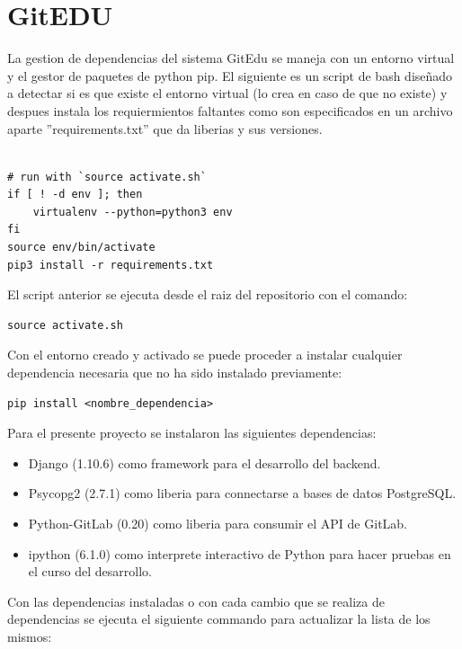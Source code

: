 \pagebreak


\section{GitEDU}

La gestion de dependencias del sistema GitEdu se maneja con un entorno virtual y el gestor de paquetes de python pip. El siguiente es un script de bash diseñado a detectar si es que existe el entorno virtual (lo crea en caso de que no existe) y despues instala los requiermientos faltantes como son especificados en un archivo aparte ''requirements.txt'' que da liberias y sus versiones.

\begin{lstlisting}

# run with `source activate.sh` 
if [ ! -d env ]; then
	virtualenv --python=python3 env
fi
source env/bin/activate
pip3 install -r requirements.txt

\end{lstlisting}

El script anterior se ejecuta desde el raiz del repositorio con el comando:

\begin{lstlisting}
source activate.sh
\end{lstlisting}

Con el entorno creado y activado se puede proceder a instalar cualquier dependencia necesaria que no ha sido instalado previamente:

\begin{lstlisting}
pip install <nombre_dependencia>
\end{lstlisting}

Para el presente proyecto se instalaron las siguientes dependencias:
\begin{itemize}
	\item Django (1.10.6) como framework para el desarrollo del backend.
    \item Psycopg2 (2.7.1) como liberia para connectarse a bases de datos PostgreSQL.
    \item Python-GitLab (0.20) como liberia para consumir el API de GitLab.
    \item ipython (6.1.0) como interprete interactivo de Python para hacer pruebas en el curso del desarrollo.
\end{itemize}

Con las dependencias instaladas o con cada cambio que se realiza de dependencias se ejecuta el siguiente commando para actualizar la lista de los mismos:

